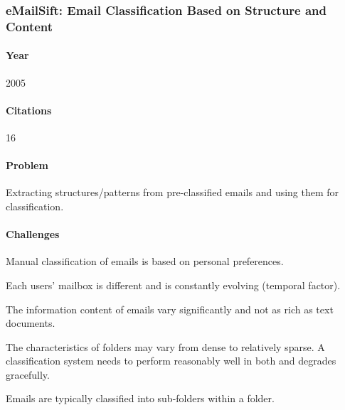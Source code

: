 \documentclass[12pt]{article}
\newenvironment{my_itemize}
{\begin{itemize}
  \setlength{\itemsep}{0cm}
  \setlength{\parskip}{0cm}}
{\end{itemize}}
\begin{document}

\subsubsection{eMailSift: Email Classification Based on Structure and Content \cite{sift01}}

\paragraph{Year} 2005

\paragraph{Citations} 16

\paragraph{Problem}
\begin{my_itemize}
 \item Extracting structures/patterns from pre-classified emails and using them for classification.
\end{my_itemize}

\paragraph{Challenges}
\begin{my_itemize}
 \item Manual classification of emails is based on personal preferences.
 \item Each users’ mailbox is different and is constantly evolving (temporal factor).
 \item The information content of emails vary significantly and not as rich as text documents.
 \item The characteristics of folders may vary from dense to relatively sparse. A classification system needs to perform reasonably well in both and degrades gracefully.
 \item Emails are typically classified into sub-folders within a folder.
\end{my_itemize}
\end{document}
